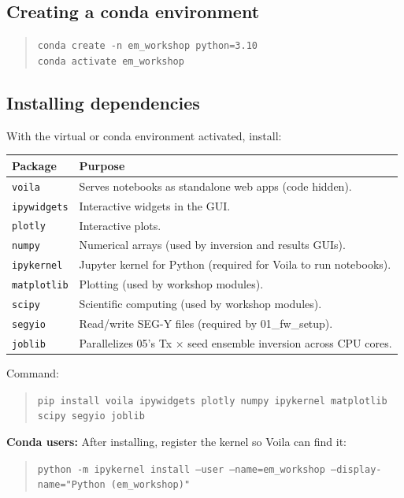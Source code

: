 \documentclass[11pt,a4paper]{article}
\begin{document}
\subsection{Creating a conda environment}

\begin{quote}
  \texttt{conda create -n em\_workshop python=3.10}\\
  \texttt{conda activate em\_workshop}
\end{quote}

\subsection{Installing dependencies}

With the virtual or conda environment activated, install:

\begin{center}
\begin{tabular}{ll}
  \toprule
  Package    & Purpose \\
  \midrule
  \texttt{voila}      & Serves notebooks as standalone web apps (code hidden). \\
  \texttt{ipywidgets}& Interactive widgets in the GUI. \\
  \texttt{plotly}    & Interactive plots. \\
  \texttt{numpy}     & Numerical arrays (used by inversion and results GUIs). \\
  \texttt{ipykernel} & Jupyter kernel for Python (required for Voila to run notebooks). \\
  \texttt{matplotlib}& Plotting (used by workshop modules). \\
  \texttt{scipy}     & Scientific computing (used by workshop modules). \\
  \texttt{segyio}    & Read/write SEG-Y files (required by 01\_fw\_setup). \\
  \texttt{joblib}    & Parallelizes 05's Tx $\times$ seed ensemble inversion across CPU cores. \\
  \bottomrule
\end{tabular}
\end{center}

Command:
\begin{quote}
  \texttt{pip install voila ipywidgets plotly numpy ipykernel matplotlib scipy segyio joblib}
\end{quote}

\textbf{Conda users:} After installing, register the kernel so Voila can find it:
\begin{quote}
  \texttt{python -m ipykernel install --user --name=em\_workshop --display-name="Python (em\_workshop)"}
\end{quote}
\end{document}
